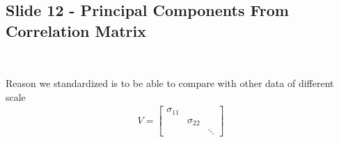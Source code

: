 \subsection{Slide 12 - Principal Components From Correlation Matrix}\hfill\\\par
\noindent Reason we standardized is to be able to compare with other data of different scale
\begin{equation*}
  \begin{gathered}
    V = \begin{bmatrix}\sigma_{11}&&\\&\sigma_{22}&\\&&\ddots\end{bmatrix}
  \end{gathered}
\end{equation*}
